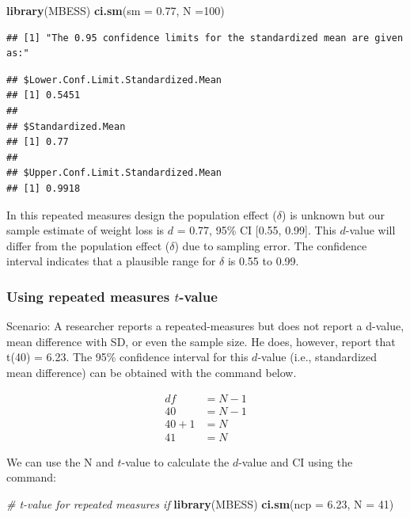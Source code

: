 \documentclass[
]{krantz}
\makeatletter
\newenvironment{Shaded}{\begin{snugshade}}{\end{snugshade}}
\newcommand{\CommentTok}[1]{\textcolor[rgb]{0.37,0.37,0.37}{\textit{#1}}}
\newcommand{\DataTypeTok}[1]{\textcolor[rgb]{0.27,0.27,0.27}{#1}}
\newcommand{\DecValTok}[1]{\textcolor[rgb]{0.06,0.06,0.06}{#1}}
\newcommand{\FloatTok}[1]{\textcolor[rgb]{0.06,0.06,0.06}{#1}}
\newcommand{\KeywordTok}[1]{\textcolor[rgb]{0.27,0.27,0.27}{\textbf{#1}}}
\newcommand{\NormalTok}[1]{#1}
\newenvironment{kframe}{%
\medskip{}
\setlength{\fboxsep}{.8em}
 \def\at@end@of@kframe{}%
 \ifinner\ifhmode%
  \def\at@end@of@kframe{\end{minipage}}%
  \begin{minipage}{\columnwidth}%
 \fi\fi%
 \def\FrameCommand##1{\hskip\@totalleftmargin \hskip-\fboxsep
 \colorbox{shadecolor}{##1}\hskip-\fboxsep
     \hskip-\linewidth \hskip-\@totalleftmargin \hskip\columnwidth}%
 \MakeFramed {\advance\hsize-\width
   \@totalleftmargin\z@ \linewidth\hsize
   \@setminipage}}%
 {\par\unskip\endMakeFramed%
 \at@end@of@kframe}
\renewenvironment{Shaded}{\begin{kframe}}{\end{kframe}}
\makeatother
\begin{document}
\begin{Shaded}
\begin{Highlighting}[]
\KeywordTok{library}\NormalTok{(MBESS)}
\KeywordTok{ci.sm}\NormalTok{(}\DataTypeTok{sm =} \FloatTok{0.77}\NormalTok{, }\DataTypeTok{N =}\DecValTok{100}\NormalTok{) }
\end{Highlighting}
\end{Shaded}

\begin{verbatim}
## [1] "The 0.95 confidence limits for the standardized mean are given as:"
\end{verbatim}

\begin{verbatim}
## $Lower.Conf.Limit.Standardized.Mean
## [1] 0.5451
## 
## $Standardized.Mean
## [1] 0.77
## 
## $Upper.Conf.Limit.Standardized.Mean
## [1] 0.9918
\end{verbatim}

In this repeated measures design the population effect (\(\delta\)) is unknown but our sample estimate of weight loss is \(d\) = 0.77, 95\% CI {[}0.55, 0.99{]}. This \(d\)-value will differ from the population effect (\(\delta\)) due to sampling error. The confidence interval indicates that a plausible range for \(\delta\) is 0.55 to 0.99.

\hypertarget{using-repeated-measures-t-value}{%
\subsubsection{\texorpdfstring{Using repeated measures \(t\)-value}{Using repeated measures t-value}}\label{using-repeated-measures-t-value}}

Scenario: A researcher reports a repeated-measures but does not report a d-value, mean difference with SD, or even the sample size. He does, however, report that t(40) = 6.23. The 95\% confidence interval for this \(d\)-value (i.e., standardized mean difference) can be obtained with the command below.

\[
\begin{aligned}
df &= N - 1 \\
40 &= N - 1\\
40 + 1 &= N\\
41 &= N
\end{aligned}
\]

We can use the N and \(t\)-value to calculate the \(d\)-value and CI using the command:

\begin{Shaded}
\begin{Highlighting}[]
\CommentTok{# t-value for repeated measures if }
\KeywordTok{library}\NormalTok{(MBESS)}
\KeywordTok{ci.sm}\NormalTok{(}\DataTypeTok{ncp =} \FloatTok{6.23}\NormalTok{, }\DataTypeTok{N =} \DecValTok{41}\NormalTok{)}
\end{Highlighting}
\end{Shaded}
\end{document}

